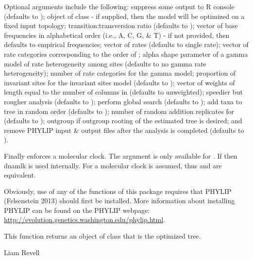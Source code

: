 \documentclass[a4paper]{book}
\begin{document}
\begin{Details}\relax
Optional arguments include the following:  suppress some output to R console (defaults to );  object of class  - if supplied, then the model will be optimized on a fixed input topology;  transition:transversion ratio (defaults to );  vector of base frequencies in alphabetical order (i.e., A, C, G, \& T) - if not provided, then defaults to empirical frequencies;  vector of rates (defaults to single rate);  vector of rate categories corresponding to the order of ;  alpha shape parameter of a gamma model of rate heterogeneity among sites (defaults to no gamma rate heterogeneity);  number of rate categories for the gamma model;  proportion of invariant sites for the invariant sites model (defaults to );  vector of weights of length equal to the number of columns in  (defaults to unweighted);  speedier but rougher analysis (defaults to );  perform global search (defaults to );  add taxa to tree in random order (defaults to );  number of random addition replicates for  (defaults to );  outgroup if outgroup rooting of the estimated tree is desired; and  remove PHYLIP input \& output files after the analysis is completed (defaults to ).

Finally  enforces a molecular clock. The argument  is only available for . If  then dnamlk is used internally. For  a molecular clock is assumed, thus  and  are equivalent.

Obviously, use of any of the functions of this package requires that PHYLIP (Felsenstein 2013) should first be installed. More information about installing PHYLIP can be found on the PHYLIP webpage: \url{http://evolution.genetics.washington.edu/phylip.html}.
\end{Details}
%
\begin{Value}
This function returns an object of class  that is the optimized tree.
\end{Value}
%
\begin{Author}\relax
Liam Revell 
\end{Author}
\end{document}
